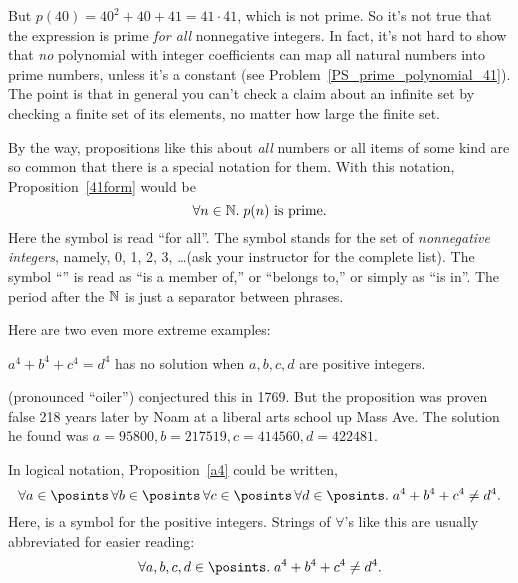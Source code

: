 But $p(40) = 40^2 + 40 + 41 = 41 \cdot 41$, which is not prime.  So
it's not true that the expression is prime \emph{for all} nonnegative
integers.
In fact, it's not hard to show that \emph{no} polynomial
with integer coefficients can map all natural numbers into prime
numbers, unless it's a constant (see Problem~\ref{PS_prime_polynomial_41}).
The point is that in general you can't check a claim about an infinite
set by checking a finite set of its elements, no matter how large the
finite set.

By the way, propositions like this about \emph{all} numbers or all items
of some kind are so common that there is a special notation for them.
With this notation, Proposition~\ref{41form} would be
\begin{equation}\label{pn}
\forall n \in \mathbb{N}.\; p(n) \text{ is prime}.
\end{equation}
Here the symbol \term{$\forall$} is read ``for all''.  The symbol
\term{$\naturals$} stands for the set of {\em nonnegative integers},
namely, 0, 1, 2, 3, \dots (ask your instructor for the complete list).
The symbol ``\term{$\in$}'' is read as ``is a member of,'' or
``belongs to,'' or simply as ``is in''.  The period after the
$\naturals$ is just a separator between phrases.

\iffalse
\begin{notesproblem}
Show that no nonconstant polynomial can map all nonnegative integers into
prime numbers.  (This can be proved using elementary algebra, but it's a
little tricky.  It will be easier to show after we study modular
arithmetic later in the term.)
\end{notesproblem}
\fi

Here are two even more extreme examples:
\begin{proposition}\label{a4}
$a^4 + b^4 + c^4 = d^4$ has no solution when $a, b, c, d$ are positive
integers.
\end{proposition}
 (pronounced ``oiler'') conjectured this in 1769.  But the proposition
was proven false 218 years later by Noam  at a liberal arts school
up Mass Ave.  The solution he found was $a = 95800, b = 217519, c = 414560, d
= 422481$.

In logical notation, Proposition~\ref{a4} could be written,
\[
\forall a \in \posints\, \forall b \in \posints\, \forall c \in \posints\, \forall
d \in \posints.\; a^4 + b^4 + c^4 \neq d^4.
\]
Here, \term{$\posints$} is a symbol for the positive integers.
Strings of $\forall$'s like this are usually abbreviated for easier reading:
\[
\forall a, b, c, d \in \posints.\; a^4 + b^4 + c^4 \neq d^4.
\]



